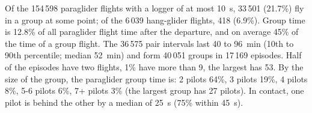 Of the 154\,598 paraglider flights with a logger of at most 10~s, 33\,501 (21.7\%) fly in a group at some point; of the 6\,039 hang-glider flights, 418 (6.9\%). Group time is 12.8\% of all paraglider flight time after the departure, and on average 45\% of the time of a group flight. The 36\,575 pair intervals last 40 to 96~min (10th to 90th percentile; median 52~min) and form 40\,051 groups in 17\,169 episodes. Half of the episodes have two flights, 1\% have more than 9, the largest has 53. By the size of the group, the paraglider group time is: 2 pilots 64\%, 3 pilots 19\%, 4 pilots 8\%, 5-6 pilots 6\%, 7+ pilots 3\% (the largest group has 27 pilots). In contact, one pilot is behind the other by a median of 25~s (75\% within 45~s).
